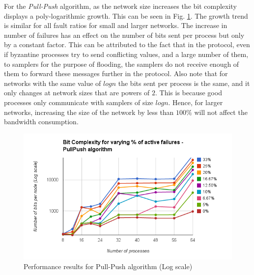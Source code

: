 For the \textit{Pull-Push} algorithm, as the network size increases the bit
complexity displays a poly-logarithmic growth. This can be seen in Fig.
\ref{fig:pull_push}. The growth trend is similar for all fault ratios for small
and larger networks. The increase in number of failures has an effect on the
number of bits sent per process but only by a constant factor. This can be
attributed to the fact that in the protocol, even if byzantine processes try to
send conflicting values, and a large number of them, to samplers for the
purpose of flooding, the samplers do not receive enough of them to forward
these messages further in the protocol. Also note that for networks with the
same value of $logn$ the bits sent per process is the same, and it only changes
at network sizes that are powers of $2$. This is because good processes only
communicate with samplers of size $logn$. Hence, for larger networks,
increasing the size of the network by less than $100\%$ will not affect the
bandwidth consumption.  
\begin{figure}[ht] \centering 
    \includegraphics[scale=0.4]{pull_push} 
    \caption{Performance
    results for Pull-Push algorithm (Log scale)} \label{fig:pull_push}
    \end{figure}

